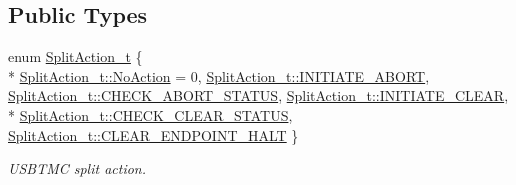 \subsection*{Public Types}
\begin{DoxyCompactItemize}
\item 
enum \hyperlink{classmdt_usbtmc_bulk_transfer_a81f2309d821053cd7c8f6e32aff93b7c}{Split\-Action\-\_\-t} \{ \\*
\hyperlink{classmdt_usbtmc_bulk_transfer_a81f2309d821053cd7c8f6e32aff93b7ca1e601ea653db1c729c9ee5746730fabe}{Split\-Action\-\_\-t\-::\-No\-Action} = 0, 
\hyperlink{classmdt_usbtmc_bulk_transfer_a81f2309d821053cd7c8f6e32aff93b7caea5c13bf8058f283040da9153953c4e7}{Split\-Action\-\_\-t\-::\-I\-N\-I\-T\-I\-A\-T\-E\-\_\-\-A\-B\-O\-R\-T}, 
\hyperlink{classmdt_usbtmc_bulk_transfer_a81f2309d821053cd7c8f6e32aff93b7ca651cbdca4ac8b302c18ac9884791194e}{Split\-Action\-\_\-t\-::\-C\-H\-E\-C\-K\-\_\-\-A\-B\-O\-R\-T\-\_\-\-S\-T\-A\-T\-U\-S}, 
\hyperlink{classmdt_usbtmc_bulk_transfer_a81f2309d821053cd7c8f6e32aff93b7cad6f130330eaada1770d26d6906b1977b}{Split\-Action\-\_\-t\-::\-I\-N\-I\-T\-I\-A\-T\-E\-\_\-\-C\-L\-E\-A\-R}, 
\\*
\hyperlink{classmdt_usbtmc_bulk_transfer_a81f2309d821053cd7c8f6e32aff93b7ca34c6b8e885527e8b41b195d3fc18677a}{Split\-Action\-\_\-t\-::\-C\-H\-E\-C\-K\-\_\-\-C\-L\-E\-A\-R\-\_\-\-S\-T\-A\-T\-U\-S}, 
\hyperlink{classmdt_usbtmc_bulk_transfer_a81f2309d821053cd7c8f6e32aff93b7cae37274c52bff64e53e5dd2ce355a5219}{Split\-Action\-\_\-t\-::\-C\-L\-E\-A\-R\-\_\-\-E\-N\-D\-P\-O\-I\-N\-T\-\_\-\-H\-A\-L\-T}
 \}
\begin{DoxyCompactList}\small\item\em U\-S\-B\-T\-M\-C split action. \end{DoxyCompactList}\end{DoxyCompactItemize}
